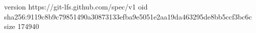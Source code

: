version https://git-lfs.github.com/spec/v1
oid sha256:9119c8b9c79851490a30873133efba9e5051e2aa19da463295de8bb5ccf3bc6c
size 174940
